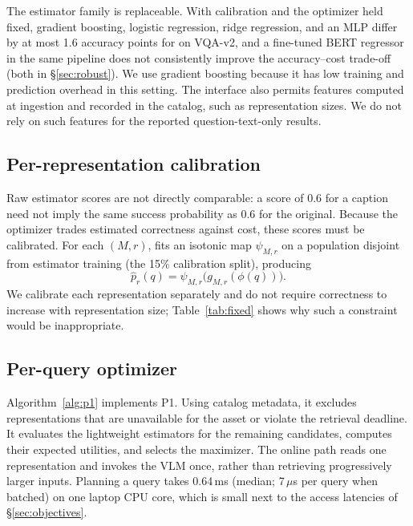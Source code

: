 The estimator family is replaceable. With calibration and the optimizer held
fixed, gradient boosting, logistic regression, ridge regression, and an MLP
differ by at most 1.6 accuracy points for \mPix on VQA-v2, and a fine-tuned
BERT regressor in the same pipeline does not consistently improve the
accuracy--cost trade-off (both in \S\ref{sec:robust}). We use gradient
boosting because it has low training and prediction overhead in this setting.
The interface also permits features computed at ingestion and recorded in the
catalog, such as representation sizes. We do not rely on such features for the
reported question-text-only results.

\subsection{Per-representation calibration}

Raw estimator scores are not directly comparable: a score of 0.6 for a
caption need not imply the same success probability as 0.6 for the original.
Because the optimizer trades estimated correctness against cost, these scores
must be calibrated. For each $(M,r)$, \system fits an isotonic map
$\psi_{M,r}$ on a population disjoint from estimator training (the 15\%
calibration split), producing
\[
\widehat p_r(q)=\psi_{M,r}\big(g_{M,r}(\phi(q))\big).
\]
We calibrate each representation separately and do not require correctness to
increase with representation size; Table~\ref{tab:fixed} shows why such a
constraint would be inappropriate.

\subsection{Per-query optimizer}

Algorithm~\ref{alg:p1} implements P1. Using catalog metadata, it excludes
representations that are unavailable for the asset or violate the retrieval
deadline. It evaluates the lightweight estimators for the remaining
candidates, computes their expected utilities, and selects the maximizer. The
online path reads one representation and invokes the VLM once, rather than
retrieving progressively larger inputs. Planning a query takes 0.64\,ms
(median; 7\,$\mu$s per query when batched) on one laptop CPU core, which is
small next to the access latencies of \S\ref{sec:objectives}.

